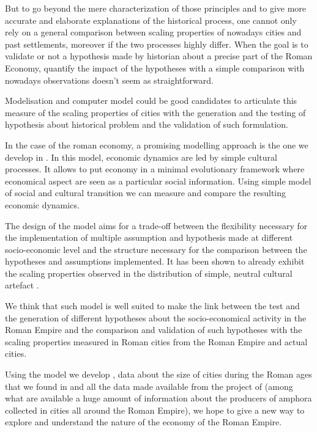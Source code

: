 \documentclass[a4paper,11pt]{article}
\begin{document}
But to go beyond the mere characterization of those principles and to give more accurate and elaborate explanations of the historical process, one cannot only rely on a general comparison between scaling properties of nowadays cities and past settlements, moreover if the two processes highly differ. 
When the goal is to validate or not a hypothesis made by historian about a precise part of the Roman Economy, quantify the impact of the hypotheses with a simple comparison with nowadays observations doesn't seem as straightforward.

Modelisation and computer model could be good candidates to articulate this measure of the scaling properties of cities with the generation and the testing of hypothesis about historical problem and the validation of such formulation.

In the case of the roman economy, a promising modelling approach is the one we develop in \cite{carrignon2015modellingthecoevolutionoftradeandcultureinpastsocieties}. In this model, economic dynamics are led by simple cultural processes. It allows to put economy in a minimal evolutionary framework where economical aspect are seen as a particular social information. Using simple model of social and cultural transition we can measure and compare the resulting economic dynamics. 

The design of the model aims for a trade-off between the flexibility necessary for the implementation of multiple assumption and hypothesis made at different socio-economic level and the structure necessary for the comparison between the hypotheses and assumptions implemented. It has been shown to already exhibit the scaling properties observed in the distribution of simple, neutral cultural artefact \citep{bentley2004randomdriftandculturechange}.


We think that such model is well suited to make the link between the test and the generation of different hypotheses about the socio-economical activity in the Roman Empire and the comparison and validation of such hypotheses with the scaling properties measured in Roman cities from the Roman Empire and actual cities. 

Using the model we develop \citep{carrignon2015modellingthecoevolutionoftradeandcultureinpastsocieties}, data about the size of cities during the Roman ages that we found in \cite{chandler1987four} and all the data made available from the project of \cite{remesal2014epnet} (among what are available a huge amount of information about the producers of amphora collected in cities all around the Roman Empire), we hope to give a new way to explore and understand the nature of the economy of the Roman Empire.
\end{document}
